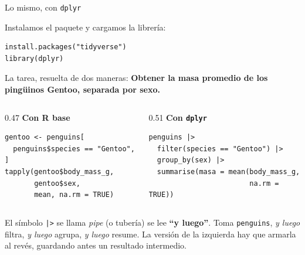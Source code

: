 \documentclass[aspectratio=169,10pt]{beamer}
\newcommand{\Rc}[1]{{\setlength{\fboxsep}{1.6pt}%
  \colorbox{codigoFondo}{\textcolor{codigoTexto}{\texttt{#1}}}}}
\newcommand{\destaca}[1]{%
  \par\vspace{3pt}\noindent
  \colorbox{azulClaro}{%
    \parbox{\dimexpr\linewidth-2\fboxsep\relax}{\vspace{3pt}#1\vspace{3pt}}}%
  \par\vspace{3pt}}
\begin{document}
\begin{frame}[fragile]{Lo mismo, con \texttt{dplyr}}

Instalamos el paquete y cargamos la librería:
\begin{lstlisting}
install.packages("tidyverse")
library(dplyr)
\end{lstlisting}

  \vspace{0.1cm}
  La tarea, resuelta de dos maneras: \textbf{Obtener la masa promedio de los pingüinos
  Gentoo, separada por sexo.}

  \vspace{0.1cm}
  \begin{columns}[T]
    \begin{column}{0.47\textwidth}
      {\footnotesize\textbf{Con R base}}
\begin{lstlisting}
gentoo <- penguins[
  penguins$species == "Gentoo", ]
tapply(gentoo$body_mass_g,
       gentoo$sex,
       mean, na.rm = TRUE)
\end{lstlisting}
    \end{column}
    \begin{column}{0.51\textwidth}
      {\footnotesize\textbf{Con \texttt{dplyr}}}
\begin{lstlisting}
penguins |>
  filter(species == "Gentoo") |>
  group_by(sex) |>
  summarise(masa = mean(body_mass_g,
                        na.rm = TRUE))
\end{lstlisting}
    \end{column}
  \end{columns}

  \vspace{0.2cm}
  \destaca{\small El símbolo \Rc{|>} se llama \textit{pipe} (o tubería) se lee \textbf{``y luego''}. Toma \texttt{penguins},
  \emph{y luego} filtra, \emph{y luego} agrupa, \emph{y luego} resume. La versión de la
  izquierda hay que armarla al revés, guardando antes un resultado intermedio.}
\end{frame}
\end{document}
